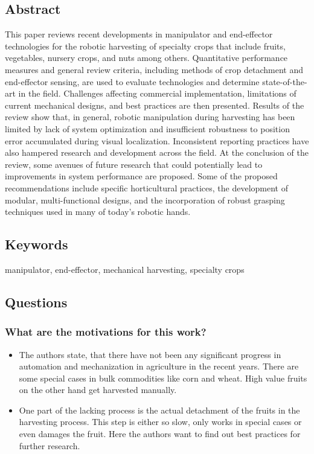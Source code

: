 \subsection*{Abstract}
This paper reviews recent developments in manipulator and end-effector technologies for the robotic
harvesting of specialty crops that include fruits, vegetables, nursery crops, and nuts among others.
Quantitative performance measures and general review criteria, including methods of crop detachment and
end-effector sensing, are used to evaluate technologies and determine state-of-the-art in the field. Challenges
affecting commercial implementation, limitations of current mechanical designs, and best practices are then
presented. Results of the review show that, in general, robotic manipulation during harvesting has been
limited by lack of system optimization and insufficient robustness to position error accumulated during
visual localization. Inconsistent reporting practices have also hampered research and development across
the field. At the conclusion of the review, some avenues of future research that could potentially lead to
improvements in system performance are proposed. Some of the proposed recommendations include
specific horticultural practices, the development of modular, multi-functional designs, and the incorporation
of robust grasping techniques used in many of today’s robotic hands.

\subsection*{Keywords}
manipulator, end-effector, mechanical harvesting, specialty crops

\subsection*{Questions}
\subsubsection*{What are the motivations for this work?}
\begin{itemize}
    \item The authors state, that there have not been any significant progress in automation and mechanization in agriculture in the recent years. There are some special cases in bulk commodities like corn and wheat. High value fruits on the other hand get harvested manually.
    \item One part of the lacking process is the actual detachment of the fruits in the harvesting process. This step is either so slow, only works in special cases or even damages the fruit. Here the authors want to find out best practices for further research.
\end{itemize}
